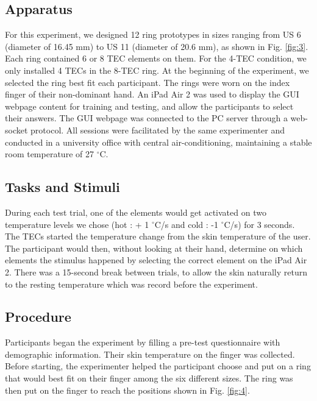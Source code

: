 \documentclass[preprint,12pt]{elsarticle}
\begin{document}
\subsection{Apparatus}
For this experiment, we designed 12 ring prototypes in sizes ranging from US 6 (diameter of 16.45 mm) to US 11 (diameter of 20.6 mm), as shown in Fig. \ref{fig:3}. Each ring contained 6 or 8 TEC elements on them. For the 4-TEC condition, we only installed 4 TECs in the 8-TEC ring. At the beginning of the experiment, we selected the ring best fit each participant. The rings were worn on the index finger of their non-dominant hand. An iPad Air 2 was used to display the GUI webpage content for training and testing, and allow the participants to select their answers. The GUI webpage was connected to the PC server through a web-socket protocol. All sessions were facilitated by the same experimenter and conducted in a university office with central air-conditioning, maintaining a stable room temperature of 27 $^{\circ}$C.

\subsection{Tasks and Stimuli}
During each test trial, one of the elements would get activated on two temperature levels we chose (hot : + 1 $^{\circ}$C/s and cold : -1 $^{\circ}$C/s) for 3 seconds.
The TECs started the temperature change from the skin temperature of the user.
The participant would then, without looking at their hand, determine on which elements the stimulus happened by selecting the correct element on the iPad Air 2. There was a 15-second  break between trials, to allow the skin naturally return to the resting temperature which was record before the experiment.

\subsection{Procedure}
Participants began the experiment by filling a pre-test questionnaire with demographic information. Their skin temperature on the finger was collected. Before starting, the experimenter helped the participant choose and put on a ring that would best fit on their finger among the six different sizes. The ring was then put on the finger to reach the positions shown in Fig. \ref{fig:4}.
\end{document}
